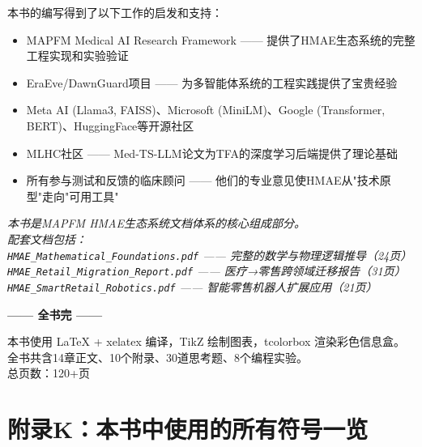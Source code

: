 \documentclass[11pt,a4paper]{ctexart}
\begin{document}
本书的编写得到了以下工作的启发和支持：

\begin{itemize}[nosep]
\item MAPFM Medical AI Research Framework —— 提供了HMAE生态系统的完整工程实现和实验验证
\item EraEve/DawnGuard项目 —— 为多智能体系统的工程实践提供了宝贵经验
\item Meta AI (Llama3, FAISS)、Microsoft (MiniLM)、Google (Transformer, BERT)、HuggingFace等开源社区
\item MLHC社区 —— Med-TS-LLM论文为TFA的深度学习后端提供了理论基础
\item 所有参与测试和反馈的临床顾问 —— 他们的专业意见使HMAE从"技术原型"走向"可用工具"
\end{itemize}

\vspace{1cm}

\begin{center}
\textit{
本书是MAPFM HMAE生态系统文档体系的核心组成部分。\\
配套文档包括：\\
\texttt{HMAE\_Mathematical\_Foundations.pdf} —— 完整的数学与物理逻辑推导（24页）\\
\texttt{HMAE\_Retail\_Migration\_Report.pdf} —— 医疗→零售跨领域迁移报告（31页）\\
\texttt{HMAE\_SmartRetail\_Robotics.pdf} —— 智能零售机器人扩展应用（21页）
}

\vspace{1.5cm}
{\Large\textbf{—— 全书完 ——}}

\vspace{0.5cm}
{\small 本书使用 \LaTeX{} + xelatex 编译，TikZ 绘制图表，tcolorbox 渲染彩色信息盒。\\
全书共含14章正文、10个附录、30道思考题、8个编程实验。\\
总页数：120+页}
\end{center}



\newpage

\section*{附录K：本书中使用的所有符号一览}
\end{document}
